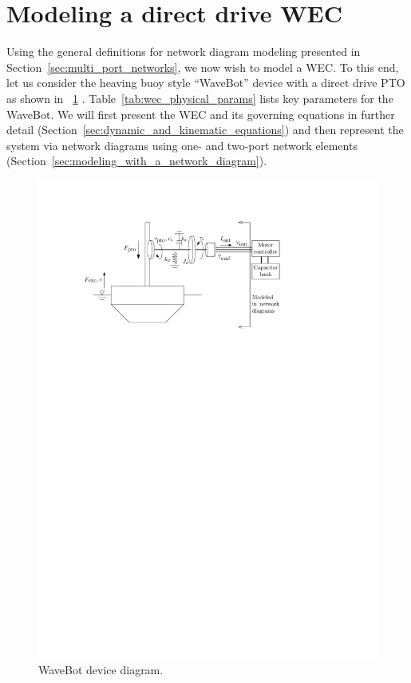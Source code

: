 \documentclass[lettersize,journal]{IEEEtran}
\begin{document}
\section{Modeling a direct drive WEC}\label{sec:modeling_a_direct_drive_wec}
Using the general definitions for network diagram modeling presented in Section~\ref{sec:multi_port_networks}, we now wish to model a WEC.
To this end, let us consider the heaving buoy style ``WaveBot'' device with a direct drive PTO as shown in \figurename~\ref{fig:wec_as_multiport_physical_diagram} \cite{Forbush:2024aa}.
Table~\ref{tab:wec_physical_params} lists key parameters for the WaveBot.
We will first present the WEC and its governing equations in further detail (Section~\ref{sec:dynamic_and_kinematic_equations}) and then represent the system via network diagrams using one- and two-port network elements (Section~\ref{sec:modeling_with_a_network_diagram}).

\begin{figure}[tb]
        \centering
        \includegraphics[width=1\columnwidth]{wec_as_multiport_phyiscal_diagram.pdf}
        \caption{WaveBot device diagram.}
        \label{fig:wec_as_multiport_physical_diagram}
\end{figure}
\end{document}
